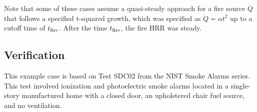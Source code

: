 Note that some of these cases assume a quasi-steady approach for a fire source $\dot Q$ that follows a specified t-squared growth, which was specified as $\dot Q = \alpha t^2$ up to a cutoff time of $t\sb{fire}$. After the time $t\sb{fire}$, the fire HRR was steady.


\clearpage


\subsection*{Verification}

This example case is based on Test SDC02 from the NIST Smoke Alarms series. This test involved ionization and photoelectric smoke alarms located in a single-story manufactured home with a closed door, an upholstered chair fuel source, and no ventilation.


